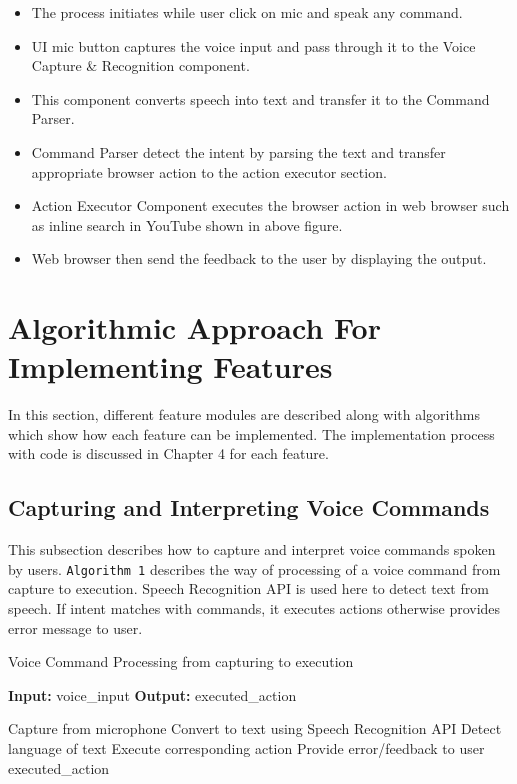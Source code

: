 \begin{itemize}
\item The process initiates while user click on mic and speak any command.
\item	UI mic button captures the voice input and pass through it to the Voice Capture \& Recognition component.
\item This component converts speech into text and transfer it to the Command Parser.
\item Command Parser detect the intent by parsing the text and transfer appropriate browser action to the action executor section. 
\item Action Executor Component executes the browser action in web browser such as inline search in YouTube shown in above figure. 
\item Web browser then send the feedback to the user by displaying the output.
\end{itemize}

\section{Algorithmic Approach For Implementing Features}
In this section, different feature modules are described along with algorithms which show how each feature can be implemented. The implementation process with code is discussed in Chapter 4 for each feature.

\subsection{Capturing and Interpreting Voice Commands}
This subsection describes how to capture and interpret voice commands spoken by users. \texttt{Algorithm 1} describes the way of  processing of a voice command from capture to execution. Speech Recognition API is used here to detect text from speech. If intent matches with commands, it executes actions otherwise provides error message to user.

\begin{algorithm}[H] 
    \caption{Voice Command Processing from capturing to execution}
    \label{alg:voice_command_processing}
    \textbf{Input:} voice\_input
    \textbf{Output:} executed\_action
    \begin{algorithmic}[1] %
        \State Capture  from microphone
        \State Convert  to text using Speech Recognition API
        \State Detect language of text
            \State Execute corresponding action
        \Else
            \State Provide error/feedback to user
        \EndIf
        \State \Return executed\_action
    \end{algorithmic}
\end{algorithm}


